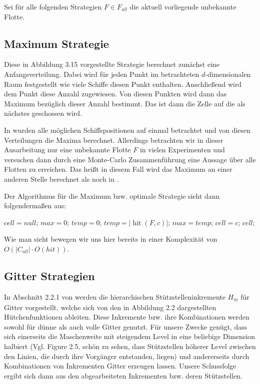 \documentclass[a4paper,12pt]{llncs}
\numberwithin{equation}{section}
\DeclareMathOperator{\hit}{hit}
\begin{document}
Sei für alle folgenden Strategien $F\in F_{all}$ die aktuell vorliegende unbekannte Flotte.

\subsection{Maximum Strategie}

Diese in \cite{M13} Abbildung 3.15 vorgestellte Strategie berechnet zunächst eine Anfangsverteilung. Dabei wird für jeden Punkt im betrachteten $d$-dimensionalen Raum festgestellt wie viele Schiffe diesen Punkt enthalten. Anschließend wird dem Punkt diese Anzahl zugewiesen. Von diesen Punkten wird dann das Maximum bezüglich dieser Anzahl bestimmt. Das ist dann die Zelle auf die als nächstes geschossen wird.

In \cite{M13} wurden alle möglichen Schiffspositionen auf einmal betrachtet und von diesen Verteilungen die Maxima berechnet. Allerdings betrachten wir in dieser Ausarbeitung nur eine unbekannte Flotte $F$ in vielen Experimenten und versuchen dann durch eine Monte-Carlo Zusammenführung eine Aussage über alle Flotten zu erreichen. Das heißt in diesem Fall wird das Maximum an einer anderen Stelle berechnet als noch in \cite{M13}. 

Der Algorithmus für die Maximum bzw. optimale Strategie sieht dann folgendermaßen aus:

\begin{tcolorbox}
	\begin{algorithmic}
		\State $cell = null$;
		\State $max = 0$;
		\State $temp = 0$;
		\State $temp=\left|\hit(F,c)\right|$;
		\State $max=temp$;
		\State $cell = c$;
		\EndIf
		\EndFor
		\State \Return $cell$;
		\EndFunction
	\end{algorithmic}
\end{tcolorbox}

Wie man sieht bewegen wir uns hier bereits in einer Komplexität von $O(\left|C_{all}\right|\cdot O(hit))$. %

\subsection{Gitter Strategien}

In Abschnitt 2.2.1 von \cite{M13} werden die hierarchischen Stützstelleninkremente $H_{\underline{m}}$ für Gitter vorgestellt, welche sich von den in \cite{M13} Abbildung 2.2 dargestellten Hütchenfunktionen ableiten. Diese Inkremente bzw. ihre Kombinationen werden sowohl für dünne als auch volle Gitter genutzt. Für unsere Zwecke genügt, dass sich einerseits die Maschenweite mit steigendem Level in eine beliebige Dimension halbiert (Vgl. \cite{P10} Figure 2.5, schön zu sehen, dass Stützstellen höherer Level zwischen den Linien, die durch ihre Vorgänger entstanden, liegen) und andererseits durch Kombinationen von Inkrementen Gitter erzeugen lassen. Unsere Schussfolge ergibt sich dann aus den abgearbeiteten Inkrementen bzw. deren Stützstellen. 
\end{document}
